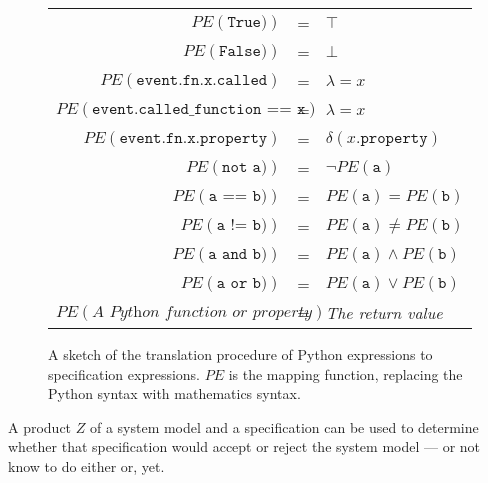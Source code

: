 \begin{figure}[h!]
	\begin{minipage}{0.9\textwidth}
		\centering
    \begin{tabular}{r c l}
      $PE(\texttt{True)})$ & = & $\top$ \\
      $PE(\texttt{False)})$ & = & $\bot$ \\
      $PE(\texttt{event.fn.x.called})$ & = & $\lambda = x$ \\
      $PE(\texttt{event.called\_function == x})$ & = & $\lambda = x$ \\
      $PE(\texttt{event.fn.x.property})$ & = & $\delta(x.\texttt{property})$ \\
      $PE(\texttt{not a)})$ & = & $\neg PE(\texttt{a})$ \\
      $PE(\texttt{a == b)})$ & = & $PE(\texttt{a}) = PE(\texttt{b})$ \\
      $PE(\texttt{a != b)})$ & = & $PE(\texttt{a}) \neq PE(\texttt{b})$ \\
      $PE(\texttt{a and b)})$ & = & $PE(\texttt{a}) \wedge PE(\texttt{b})$ \\
      $PE(\texttt{a or b)})$ & = & $PE(\texttt{a}) \vee PE(\texttt{b})$ \\
      $PE(\textit{A Python function or property})$ & = & \textit{The return value} \\
    \end{tabular}
  \end{minipage}
  \caption{A sketch of the translation procedure of Python expressions to
    specification expressions. $PE$ is the mapping function, replacing the
    Python syntax with mathematics syntax.}
  \label{figure-semantics-translation}
\end{figure}



A product $Z$ of a system model and a specification can be used to determine
whether that specification would accept or reject the system model --- or not
know to do either or, yet.

